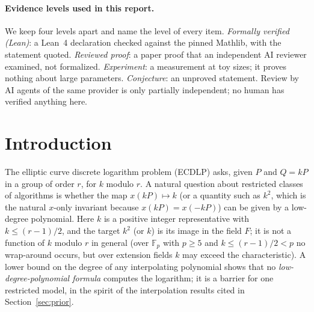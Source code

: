 \documentclass[11pt,a4paper]{article}
\theoremstyle{remark}
\newcommand{\F}{\mathbb{F}}
\begin{document}
\begin{abstract}
For each family it states the mechanism, the measured or derived cost copied from the ledger, the exact obstacle and the evidence level; all of it is experiment or unreviewed derivation, except the narrower E0/E3 remarks reviewed in REV-6c73a098 (decision revise). It also records a methodological lesson:
naive log-log exponents at small $r$ are biased low by setup cost, so $\alpha\sqrt r+\gamma$ fits or a same-implementation rho control are required.
\textbf{No improvement over Pollard rho is claimed anywhere in this report.} The contribution is the quantified obstruction map at toy scale together with the formal barriers for restricted models already present in version~2 (Lean-verified degree and straight-line-program bounds).
\end{abstract}

\paragraph{Evidence levels used in this report.} We keep four levels apart and name the level of every item.
\emph{Formally verified (Lean)}: a Lean~4 declaration checked against the pinned Mathlib, with the statement quoted.
\emph{Reviewed proof}: a paper proof that an independent AI reviewer examined, not formalized.
\emph{Experiment}: a measurement at toy sizes; it proves nothing about large parameters.
\emph{Conjecture}: an unproved statement. Review by AI agents of the same provider is only partially independent; no human has verified anything here.

\section{Introduction}
The elliptic curve discrete logarithm problem (ECDLP) asks, given $P$ and $Q=kP$ in a group of order $r$,
for $k$ modulo $r$. A natural question about restricted classes of algorithms is whether the map
$x(kP)\mapsto k$ (or a quantity such as $k^2$, which is the natural $x$-only invariant because
$x(kP)=x(-kP)$) can be given by a low-degree polynomial. Here $k$ is a positive integer representative with
$k\le (r-1)/2$, and the target $k^2$ (or $k$) is its image in the field $F$; it is not a function of $k$ modulo $r$ in general
(over $\F_p$ with $p\ge5$ and $k\le(r-1)/2<p$ no wrap-around occurs, but over extension fields $k$ may exceed the characteristic). A lower bound on the degree of any interpolating
polynomial shows that no \emph{low-degree-polynomial formula} computes the logarithm; it is a barrier for one
restricted model, in the spirit of the interpolation results cited in Section~\ref{sec:prior}.
\end{document}
